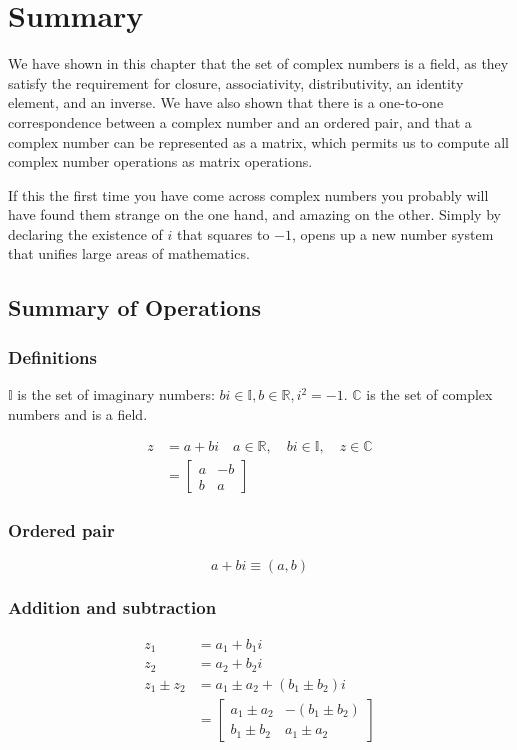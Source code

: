 \section{Summary}
We have shown in this chapter that the set of complex numbers is a field, as they satisfy the requirement for closure, associativity, distributivity, an identity element, and an inverse. We have also shown that there is a one-to-one correspondence between a complex number and an ordered pair, and that a complex number can be represented as a matrix, which permits us to compute all complex number operations as matrix operations.

If this the first time you have come across complex numbers you probably will have found them strange on the one hand, and amazing on the other. Simply by declaring the existence of $i$ that squares to $-1$, opens up a new number system that unifies large areas of mathematics.

\subsection{Summary of Operations}
\subsubsection*{Definitions}
$\mathbb{I}$ is the set of imaginary numbers: $b i \in \mathbb{I}, b \in \mathbb{R}, i^{2}=-1$. $\mathbb{C}$ is the set of complex numbers and is a field.

$$
\begin{aligned}
z & =a+b i \quad a \in \mathbb{R}, \quad b i \in \mathbb{I}, \quad z \in \mathbb{C} \\
& =\left[\begin{array}{cc}
a & -b \\
b & a
\end{array}\right]
\end{aligned}
$$

\subsubsection*{Ordered pair}
$$
a+b i \equiv(a, b)
$$

\subsubsection*{Addition and subtraction}
$$
\begin{aligned}
z_{1} & =a_{1}+b_{1} i \\
z_{2} & =a_{2}+b_{2} i \\
z_{1} \pm z_{2} & =a_{1} \pm a_{2}+\left(b_{1} \pm b_{2}\right) i \\
& =\left[\begin{array}{lc}
a_{1} \pm a_{2} & -\left(b_{1} \pm b_{2}\right) \\
b_{1} \pm b_{2} & a_{1} \pm a_{2}
\end{array}\right]
\end{aligned}
$$

